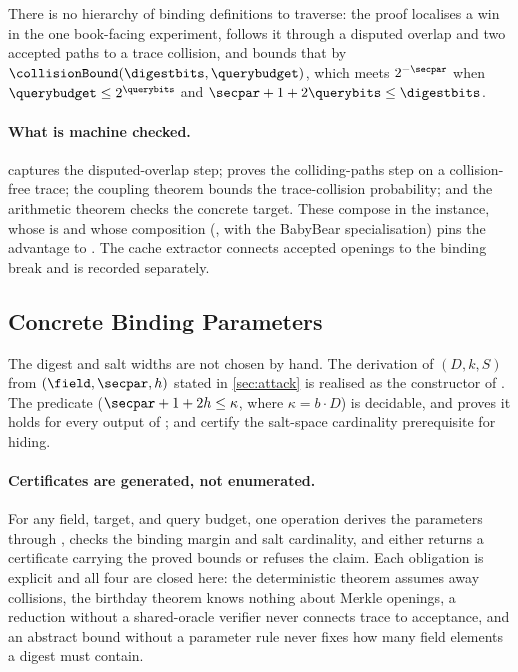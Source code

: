 There is no hierarchy of binding definitions to traverse: the proof localises a
win in the one book-facing experiment, follows it through a disputed overlap and
two accepted paths to a trace collision, and bounds that by
$\collisionBound(\digestbits,\querybudget)$, which meets $2^{-\secpar}$ when
$\querybudget\le2^{\querybits}$ and $\secpar+1+2\querybits\le\digestbits$.

\paragraph{What is machine checked.}
 captures the disputed-overlap step; 
proves the colliding-paths step on a collision-free trace; the coupling theorem
bounds the trace-collision probability; and the arithmetic theorem checks the
concrete target.  These compose in the 
instance, whose  is
 and whose
 composition (, with
 the BabyBear specialisation) pins the advantage
to .  The cache extractor 
connects accepted openings to the binding break and is recorded separately.

\subsection{Concrete Binding Parameters}
\label{sec:params}

The digest and salt widths are not chosen by hand.  The derivation of
$(D,k,S)$ from $(\field,\secpar,h)$ stated in \cref{sec:attack} is realised as
the  constructor of .  The predicate
 ($\secpar+1+2h\le\kappa$, where $\kappa=b\cdot D$)
is decidable, and  proves it holds for every
output of ;  and
 certify the salt-space cardinality prerequisite for
hiding.

\paragraph{Certificates are generated, not enumerated.}
For any field, target, and query budget, one operation derives the parameters
through , checks the binding margin and salt cardinality, and
either returns a certificate carrying the proved bounds or refuses the claim.
Each obligation is explicit and all four are closed here: the deterministic
theorem assumes away collisions, the birthday theorem knows nothing about Merkle
openings, a reduction without a shared-oracle verifier never connects trace to
acceptance, and an abstract bound without a parameter rule never fixes how many
field elements a digest must contain.

